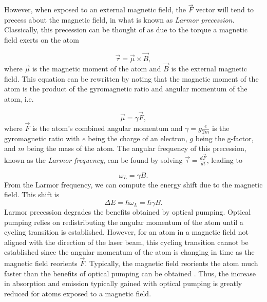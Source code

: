 However, when exposed to an external magnetic field, the $\vec F$ vector will tend to precess about the magnetic field, in what is known as \textit{Larmor precession}. Classically, this precession can be thought of as due to the torque a magnetic field exerts on the atom

\begin{equation}
  \vec \tau = \vec \mu \times \vec B,
  \label{larmortorque}
\end{equation}
%
where $\vec \mu$ is the magnetic moment of the atom and $\vec B$ is the external magnetic field. This equation can be rewritten by noting that the magnetic moment of the atom is the product of the gyromagnetic ratio and angular momentum of the atom, i.e.

\begin{equation}
  \vec \mu = \gamma \vec F,
  \label{magneticmoment}
\end{equation}
%
where $\vec F$ is the atom's combined angular momentum and $\gamma = g\frac{e}{2m}$ is the gyromagnetic ratio with $e$ being the charge of an electron, $g$ being the g-factor, and $m$ being the mass of the atom.
%
%
The angular frequency of this precession, known as the \textit{Larmor frequency}, can be found by solving $\vec \tau = \frac{d\vec F}{dt}$, leading to

\begin{equation}
  \omega_L = \gamma B.
  \label{larmorfrequency}
\end{equation}
%
From the Larmor frequency, we can compute the energy shift due to the magnetic field. This shift is
\begin{equation}
		\Delta E = \hbar \omega_L = \hbar \gamma B.
		\label{ehw}
\end{equation}
%
Larmor precession degrades the benefits obtained by optical pumping. Optical pumping relies on redistributing the angular momentum of the atom until a cycling transition is established. However, for an atom in a magnetic field not aligned with the direction of the laser beam, this cycling transition cannot be established since the angular momentum of the atom is changing in time as the magnetic field reorients $\vec F$. Typically, the magnetic field reorients the atom much faster than the benefits of optical pumping can be obtained \cite{Kane2014}. Thus, the increase in absorption and emission typically gained with optical pumping is greatly reduced for atoms exposed to a magnetic field.


